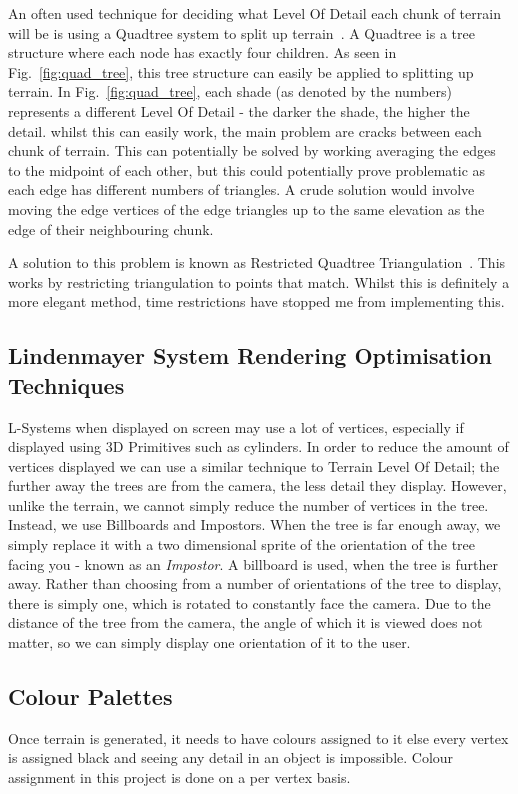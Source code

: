 \documentclass[a4paper,10pt]{report}
\begin{document}
An often used technique for deciding what Level Of Detail each chunk of terrain will be is using a Quadtree system to split up terrain~\cite{pajarola1998large}. A Quadtree is a tree structure where each node has exactly four children. As seen in Fig.~\ref{fig:quad_tree}, this tree structure can easily be applied to splitting up terrain. In Fig.~\ref{fig:quad_tree}, each shade (as denoted by the numbers) represents a different Level Of Detail - the darker the shade, the higher the detail. whilst this can easily work, the main problem are cracks between each chunk of terrain. This can potentially be solved by working averaging the edges to the midpoint of each other, but this could potentially prove problematic as each edge has different numbers of triangles. A crude solution would involve moving the edge vertices of the edge triangles up to the same elevation as the edge of their neighbouring chunk. \medskip

A solution to this problem is known as Restricted Quadtree Triangulation~\cite{pajarola1998large}. This works by restricting triangulation to points that match. Whilst this is definitely a more elegant method, time restrictions have stopped me from implementing this. 

\subsection{Lindenmayer System Rendering Optimisation Techniques}
L-Systems when displayed on screen may use a lot of vertices, especially if displayed using 3D Primitives such as cylinders. In order to reduce the amount of vertices displayed we can use a similar technique to Terrain Level Of Detail; the further away the trees are from the camera, the less detail they display. However, unlike the terrain, we cannot simply reduce the number of vertices in the tree. Instead, we use Billboards and Impostors. When the tree is far enough away, we simply replace it with a two dimensional sprite of the orientation of the tree facing you - known as an \textit{Impostor}. A billboard is used, when the tree is further away. Rather than choosing from a number of orientations of the tree to display, there is simply one, which is rotated to constantly face the camera. Due to the distance of the tree from the camera, the angle of which it is viewed does not matter, so we can simply display one orientation of it to the user.

\clearpage
\subsection{Colour Palettes}
Once terrain is generated, it needs to have colours assigned to it else every vertex is assigned black and seeing any detail in an object is impossible. Colour assignment in this project is done on a per vertex basis.
\end{document}
